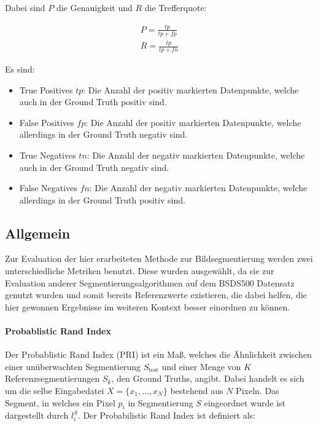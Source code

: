 Dabei sind $P$ die Genauigkeit und $R$ die Trefferquote:

\begin{eqnarray}
P = \frac{tp}{tp+fp}\\
R = \frac{tp}{tp+fn}
\end{eqnarray}

Es sind:

\begin{itemize}
	\item{True Positives $tp$:} Die Anzahl der positiv markierten Datenpunkte, welche auch in der Ground Truth positiv sind.
	\item{False Positives $fp$:} Die Anzahl der positiv markierten Datenpunkte, welche allerdings in der Ground Truth negativ sind.
	\item{True Negatives $tn$:} Die Anzahl der negativ markierten Datenpunkte, welche auch in der Ground Truth negativ sind.
	\item{False Negatives $fn$:} Die Anzahl der negativ markierten Datenpunkte, welche allerdings in der Ground Truth positiv sind.
\end{itemize}

\subsection{Allgemein}
\label{ssec:eval_general}

Zur Evaluation der hier erarbeiteten Methode zur Bildsegmentierung werden zwei unterschiedliche Metriken benutzt. Diese wurden ausgewählt, da sie zur Evaluation anderer Segmentierungsalgorithmen auf dem BSDS500 Datensatz \cite{bsd500} genutzt wurden und somit bereits Referenzwerte existieren, die dabei helfen, die hier gewonnen Ergebnisse im weiteren Kontext besser einordnen zu können. \cite{arbelaez_10, xia_17}

\paragraph{Probablistic Rand Index}

Der Probablistic Rand Index (PRI) ist ein Maß, welches die Ähnlichkeit zwischen einer unüberwachten Segmentierung $S_\text{test}$ und einer Menge von $K$ Referenzsegmentierungen $S_k$, den Ground Truths, angibt. Dabei handelt es sich um die selbe Eingabedatei $X=\{x_1,\ldots,x_N\}$ bestehend aus $N$ Pixeln. Das Segment, in welches ein Pixel $p_i$ in Segmentierung $S$ eingeordnet wurde ist dargestellt durch $l_i^S$. Der Probabilistic Rand Index ist definiert als: \cite{pantofaru_07}

